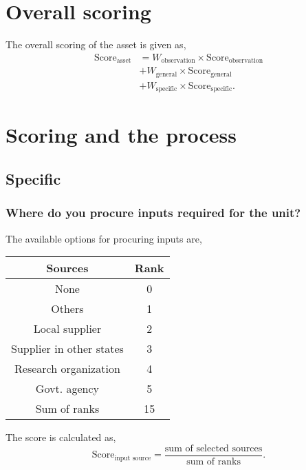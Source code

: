 \documentclass[oneside,twocolumn]{article}
\newcommand{\tsub}[2]{\text{#1}_{\text{#2}}}
\newcommand{\tsubb}[2]{#1_{\text{#2}}}
\newenvironment{ttable}
               {
                 \begin{center}
                   \begin{tabular}{c|c}
                     \hline
               }
               {
                 \\ \hline
                   \end{tabular}
                 \end{center}
               }
\begin{document}
               \section{Overall scoring}
               The overall scoring of the asset is given  as,
               \begin{align*}
                 \tsub{Score}{asset} &= \tsubb{W}{observation} \times \tsub{Score}{observation} \\
                 &+ \tsubb{W}{general} \times \tsub{Score}{general} \\
                 &+ \tsubb{W}{specific} \times \tsub{Score}{specific}.
               \end{align*}
               
               \section{Scoring and the process}
               \subsection{Specific}
               \subsubsection{Where do you procure inputs required for the unit?}
               The available options for procuring inputs are,
               \begin{ttable}
                 Sources & Rank \\ \hline
                 None & 0 \\
                 Others & 1 \\
                 Local supplier & 2 \\
                 Supplier in other states & 3 \\
                 Research organization & 4 \\
                 Govt. agency & 5 \\ \hline
                 Sum of ranks & 15
               \end{ttable}

               The score is calculated as,
               \[
               \tsub{Score}{input source} = \dfrac{\text{sum of selected sources}}{\text{sum of ranks}}.
               \]
\end{document}
